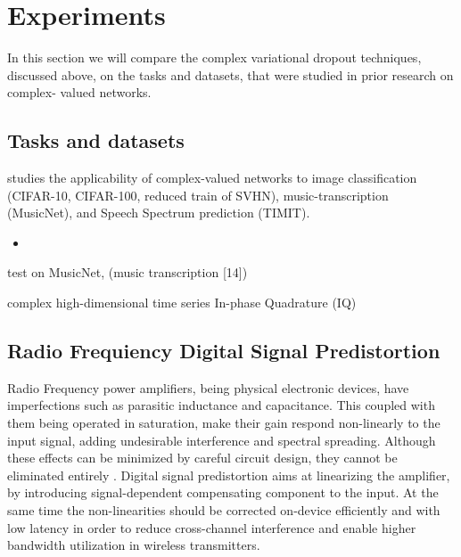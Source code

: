 \documentclass[a4paper,10pt]{article}
\begin{document}




\section{Experiments} %
\label{sec:experiments}

In this section we will compare the complex variational dropout techniques, discussed
above, on the tasks and datasets, that were studied in prior research on complex-%
valued networks.

\subsection{Tasks and datasets} %
\label{sub:tasks_and_datasets}

\cite{trabelsi_deep_2017} studies the applicability of complex-valued networks to
image classification (CIFAR-10, CIFAR-100, reduced train of SVHN), music-transcription
(MusicNet), and Speech Spectrum prediction (TIMIT).
\begin{itemize}
  \item 
\end{itemize}


test on MusicNet, (music transcription [14])

complex high-dimensional time series In-phase Quadrature (IQ)

\cite{monning_evaluation_2018}
\cite{jankowski_complex-valued_1996}
\cite{amin_complex-valued_2012}
\cite{sarroff_complex_2018}


\subsection{Radio Frequiency Digital Signal Predistortion} %
\label{sub:radio_freq_dpd}

Radio Frequency power amplifiers, being physical electronic devices, have imperfections such
as parasitic inductance and capacitance. This coupled with them being operated in saturation,
make their gain respond non-linearly to the input signal, adding undesirable interference and
spectral spreading. Although these effects can be minimized by careful circuit design, they
cannot be eliminated entirely \cite{citation_needed}. Digital signal predistortion aims at
linearizing the amplifier, by introducing signal-dependent compensating component to the input.
At the same time the non-linearities should be corrected on-device efficiently and with low
latency in order to reduce cross-channel interference and enable higher bandwidth utilization
in wireless transmitters.
\end{document}
